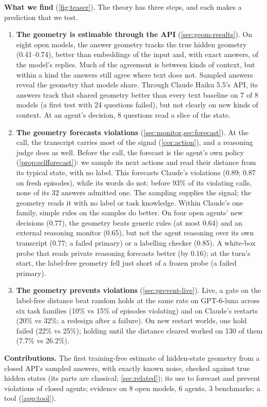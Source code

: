 \textbf{What we find} (\cref{fig:teaser}). The theory has three steps, and each makes a prediction that we test.
\begin{enumerate}[leftmargin=*,itemsep=1pt,topsep=2pt]
\item \textbf{The geometry is estimable through the API} (\cref{sec:geom-results}). On eight open models, the answer geometry tracks the true hidden geometry (0.41--0.74), better than embeddings of the input and, with exact answers, of the model's replies. Much of the agreement is between kinds of context, but within a kind the answers still agree where text does not. Sampled answers reveal the geometry that models share. Through Claude Haiku 5.5's API, its answers track that shared geometry better than every text baseline on 7 of 8 models (a first test with 24 questions failed), but not clearly on new kinds of context. At an agent's decision, 8 questions read a slice of the state.
\item \textbf{The geometry forecasts violations} (\cref{sec:monitor,sec:forecast}). At the call, the transcript carries most of the signal (\cref{cor:action}), and a reasoning judge does as well. Before the call, the forecast is the agent's own policy (\cref{prop:selfforecast}): we sample its next actions and read their distance from its typical state, with no label. This forecasts Claude's violations (0.89; 0.87 on fresh episodes), while its words do not: before 93\% of its violating calls, none of its 32 answers admitted one. The sampling supplies the signal; the geometry reads it with no label or task knowledge. Within Claude's one family, simple rules on the samples do better. On four open agents' new decisions (0.77), the geometry beats generic rules (at most 0.64) and an external reasoning monitor (0.65), but not the agent reasoning over its own transcript (0.77; a failed primary) or a labelling checker (0.85). A white-box probe that reads private reasoning forecasts better (by 0.16); at the turn's start, the label-free geometry fell just short of a frozen probe (a failed primary).
\item \textbf{The geometry prevents violations} (\cref{sec:prevent-live}). Live, a gate on the label-free distance beat random holds at the same rate on GPT-6-luna across six task families (10\% vs 15\% of episodes violating) and on Claude's restarts (20\% vs 32\%; a redesign after a failure). On new restart worlds, one hold failed (22\% vs 25\%); holding until the distance cleared worked on 130 of them (7.7\% vs 26.2\%).
\end{enumerate}
\textbf{Contributions.} The first training-free estimate of hidden-state geometry from a closed API's sampled answers, with exactly known noise, checked against true hidden states (its parts are classical; \cref{sec:related}); its use to forecast and prevent violations of closed agents; evidence on 8 open models, 6 agents, 3 benchmarks; a tool (\cref{app:tool}).

